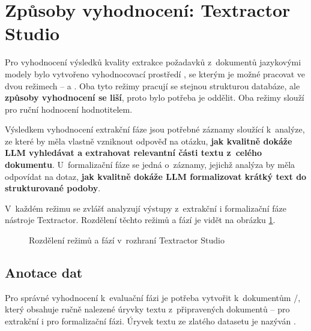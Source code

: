 \documentclass[czech, bc, kiv, he, iso690numb, pdf]{fasthesis}
\begin{document}
\section{Způsoby vyhodnocení: Textractor Studio}
Pro vyhodnocení výsledků kvality extrakce požadavků z~dokumentů jazykovými modely bylo vytvořeno vyhodnocovací prostředí , se kterým je možné pracovat ve dvou režimech --  a . Oba tyto režimy pracují se stejnou strukturou databáze, ale \textbf{způsoby vyhodnocení se liší}, proto bylo potřeba je oddělit. Oba režimy slouží pro ruční hodnocení hodnotitelem.

Výsledkem vyhodnocení extrakční fáze jsou potřebné záznamy sloužící k~analýze, ze které by měla vlastně vzniknout odpověď na otázku, \textbf{jak kvalitně dokáže LLM vyhledávat a extrahovat relevantní části textu z~celého dokumentu}. U~formalizační fáze se jedná o~záznamy, jejichž analýza by měla odpovídat na dotaz, \textbf{jak kvalitně dokáže LLM formalizovat krátký text do strukturované podoby}.

V~každém režimu se zvlášť analyzují výstupy z~extrakční i formalizační fáze nástroje Textractor. Rozdělení těchto režimů a fází je vidět na obrázku \ref{fig:tikz-gui-rezimy}.

\begin{figure}[h]
    \centering
{}
\caption{Rozdělení režimů a fází v~rozhraní Textractor Studio}
\label{fig:tikz-gui-rezimy}
\end{figure}

\subsection{Anotace dat}
Pro správné vyhodnocení k~evaluační fázi je potřeba vytvořit k~dokumentům /, který obsahuje ručně nalezené úryvky textu z~připravených dokumentů -- pro extrakční i pro formalizační fázi. Úryvek textu ze zlatého datasetu je nazýván .
\end{document}

